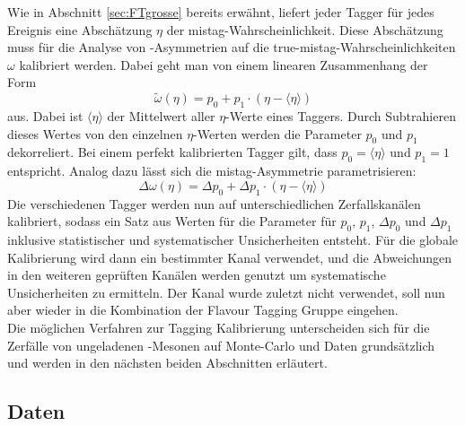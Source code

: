 Wie in Abschnitt \ref{sec:FTgrosse} bereits erwähnt, liefert jeder Tagger für jedes Ereignis eine Abschätzung $\eta$ der mistag-Wahrscheinlichkeit. Diese Abschätzung muss für die Analyse von \CP-Asymmetrien auf die true-mistag-Wahrscheinlichkeiten $\omega$ kalibriert werden. Dabei geht man von einem linearen Zusammenhang der Form
\begin{equation}
\widetilde{\omega}(\eta)=p_0+p_1\cdot\left(\eta-\langle\eta\rangle\right)\label{eq:linear}
\end{equation}
aus. Dabei ist $\langle\eta\rangle$ der Mittelwert aller $\eta$-Werte eines Taggers. Durch Subtrahieren dieses Wertes von den einzelnen $\eta$-Werten werden die Parameter $p_0$ und $p_1$ dekorreliert. Bei einem perfekt kalibrierten Tagger gilt, dass $p_0=\langle\eta\rangle$ und $p_1=1$ entspricht. Analog dazu lässt sich die mistag-Asymmetrie parametrisieren:
\begin{equation}
\Delta\omega(\eta)=\Delta p_0+\Delta p_1\cdot\left(\eta-\langle\eta\rangle\right)\label{eq:lineardelta}
\end{equation}
Die verschiedenen Tagger werden nun auf unterschiedlichen Zerfallskanälen kalibriert, sodass ein Satz aus Werten für die Parameter für $p_0$, $p_1$, $\Delta p_0$ und $\Delta p_1$ inklusive statistischer und systematischer Unsicherheiten entsteht. Für die globale Kalibrierung wird dann ein bestimmter Kanal verwendet, und die Abweichungen in den weiteren geprüften Kanälen werden genutzt um systematische Unsicherheiten zu ermitteln. Der Kanal \BdToDpi wurde zuletzt nicht verwendet, soll nun aber wieder in die Kombination der Flavour Tagging Gruppe eingehen.\\
Die möglichen Verfahren zur Tagging Kalibrierung unterscheiden sich für die Zerfälle von ungeladenen \B-Mesonen auf Monte-Carlo und Daten grundsätzlich und werden in den nächsten beiden Abschnitten erläutert.   

\subsection{Daten}\label{sec:kalibrierungDaten}

